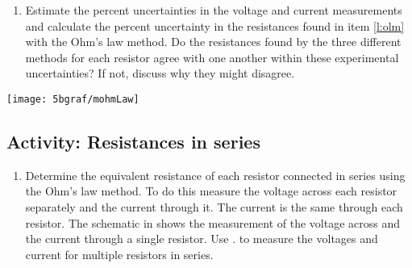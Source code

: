 \begin{multicols}{2}
\begin{enumerate}
	\item Estimate the percent uncertainties in the voltage and current measurements and calculate the percent uncertainty in the resistances found in item \ref{l:olm} with the Ohm's law method.  Do the resistances found by the three different methods for each resistor agree with one another within these experimental uncertainties? If not, discuss why they might disagree.
	
\end{enumerate}


\begin{center}
	\texttt{[image: 5bgraf/mohmLaw]}%
	\label{f:mamblock} %
\end{center}

\subsection{Activity: Resistances in series} \label{s:series}
\begin{enumerate}
	\item \label{l:eqs} Determine the equivalent resistance of each resistor connected in series using the Ohm's law method. To do this measure the voltage across each resistor separately and the current through it. The current is the same through each resistor. The schematic in  shows the measurement of the voltage across and the current through a single resistor. Use  . to measure the voltages and current for multiple resistors in series.
	

\end{enumerate}
\end{multicols}
